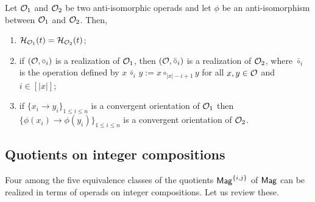 \begin{Proposition} \label{prop:recall_anti_isomorphic}
  Let $\mathcal{O}_1$ and $\mathcal{O}_2$ be two anti-isomorphic operads and let
  $\phi$ be an anti-isomorphism between $\mathcal{O}_1$ and $\mathcal{O}_2$. Then,
    \begin{enumerate}[label={(\it\roman*)}]
        \item $\mathcal{H}_{\mathcal{O}_1}(t) = \mathcal{H}_{\mathcal{O}_2}(t)$;
        \item if $\left(\mathcal{O}, \circ_i\right)$ is a realization of
        $\mathcal{O}_1$, then
        \begin{math}
            \left(\mathcal{O}, \bar{\circ}_i\right)
        \end{math}
        is a realization of $\mathcal{O}_2$, where $\bar{\circ}_i$ is the
        operation defined by
        \begin{math}
            x \, \bar{\circ}_i \, y := x \circ_{|x| - i + 1} y
        \end{math}
        for all $x, y \in \mathcal{O}$ and $i \in [|x|]$;
        \item if $\{ x_i \rightarrow y_i \}_{1 \leq i \leq n}$ is a
        convergent orientation of $\mathcal{O}_1$ then
        $\{ \phi\left(x_i\right) \rightarrow
        \phi\left(y_i\right) \}_{1 \leq i \leq n}$ is a convergent
        orientation of $\mathcal{O}_2$.
    \end{enumerate}
\end{Proposition}
\medbreak


\subsection{Quotients on integer compositions}
Four among the five equivalence classes of the quotients
$\mathsf{Mag}^{\{i, j\}}$ of $\mathsf{Mag}$ can be realized in terms of operads on
integer compositions. Let us review these.
\medbreak

